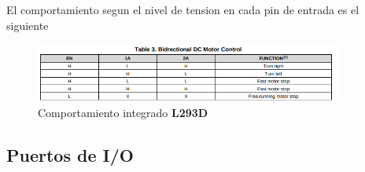 \documentclass[12pt]{article}
\begin{document}
El comportamiento segun el nivel de tension en cada pin de entrada es el siguiente

\begin{figure}[H]
    \centering
    \includegraphics[width=0.9\textwidth]{pin-response}
    \caption{Comportamiento integrado \textbf{L293D}}
\end{figure}

\subsection{Puertos de I/O}
\end{document}

